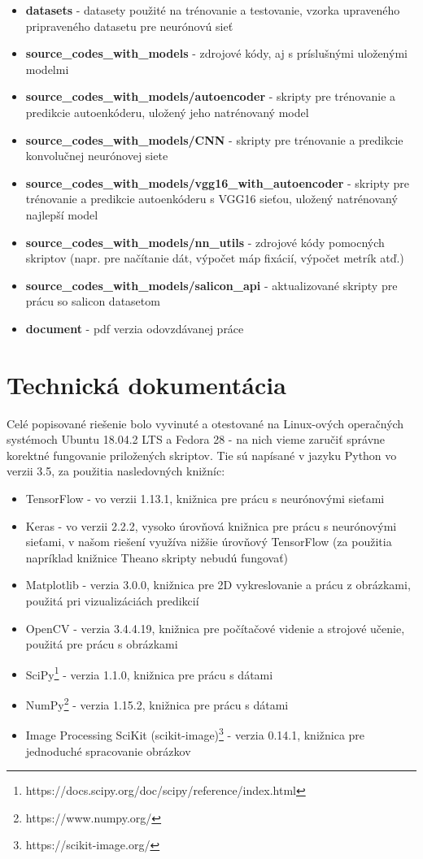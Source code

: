 \begin{itemize}
	\item \textbf{datasets} - datasety použité na trénovanie a testovanie, vzorka upraveného pripraveného datasetu pre neurónovú sieť
	\item \textbf{source\_codes\_with\_models} - zdrojové kódy, aj s príslušnými uloženými modelmi
	\item \textbf{source\_codes\_with\_models/autoencoder} - skripty pre trénovanie a predikcie autoenkóderu, uložený jeho natrénovaný model 
	\item \textbf{source\_codes\_with\_models/CNN} - skripty pre trénovanie a predikcie konvolučnej neurónovej siete
	\item \textbf{source\_codes\_with\_models/vgg16\_with\_autoencoder} - skripty pre trénovanie a predikcie autoenkóderu s VGG16 sieťou, uložený natrénovaný najlepší model
	\item \textbf{source\_codes\_with\_models/nn\_utils} - zdrojové kódy pomocných skriptov (napr. pre načítanie dát, výpočet máp fixácií, výpočet metrík atď.)
	\item \textbf{source\_codes\_with\_models/salicon\_api} - aktualizované skripty pre prácu so salicon datasetom
	\item \textbf{document} - pdf verzia odovzdávanej práce
\end{itemize}
\newpage
\null
\thispagestyle{empty}

\newpage
\section{Technická dokumentácia}
\label{technical_doc}

Celé popisované riešenie bolo vyvinuté a otestované na Linux-ových operačných systémoch Ubuntu 18.04.2 LTS a Fedora 28 - na nich vieme  zaručiť správne korektné fungovanie priložených skriptov. Tie sú napísané v jazyku Python vo verzii 3.5, za použitia nasledovných knižníc:

\begin{itemize}
	\item TensorFlow - vo verzii 1.13.1, knižnica pre prácu s neurónovými sieťami 
	\item Keras - vo verzii 2.2.2, vysoko úrovňová knižnica pre prácu s neurónovými sieťami, v našom riešení využíva nižšie úrovňový TensorFlow (za použitia napríklad knižnice Theano skripty nebudú fungovať)
	\item Matplotlib - verzia 3.0.0, knižnica pre 2D vykreslovanie a prácu z obrázkami, použitá pri vizualizáciách predikcií
	\item OpenCV - verzia 3.4.4.19, knižnica pre počítačové videnie a strojové učenie, použitá pre prácu s obrázkami
	\item SciPy\footnote{https://docs.scipy.org/doc/scipy/reference/index.html} - verzia 1.1.0, knižnica pre prácu s dátami
	\item NumPy\footnote{https://www.numpy.org/} - verzia 1.15.2, knižnica pre prácu s dátami
	\item Image Processing SciKit (scikit-image)\footnote{https://scikit-image.org/} - verzia 0.14.1, knižnica pre jednoduché spracovanie obrázkov
\end{itemize}

